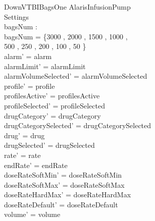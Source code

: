 \begin{schema}{DownVTBIBagsOne}
	\Delta AlarisInfusionPump\\
	 Settings\\
	 \pagebreak 
	bagsNum : \nat \rel \nat\\
	\where
	bagsNum = \{3000 , 2000 , 1500 , 1000 , \\
	500 , 250 , 200 , 100 , 50 \}\\
	alarm' = alarm\\
	alarmLimit' = alarmLimit\\
	alarmVolumeSelected' = alarmVolumeSelected\\
	profile' = profile\\
	profilesActive' = profilesActive\\  
	  profileSelected' = profileSelected\\
	drugCategory' = drugCategory\\ drugCategorySelected' = drugCategorySelected\\
	drug' = drug\\ drugSelected' = drugSelected\\
	rate' = rate\\
	endRate' = endRate\\
	doseRateSoftMin' = doseRateSoftMin\\
	doseRateSoftMax' = doseRateSoftMax\\
	doseRateHardMax' = doseRateHardMax\\
	doseRateDefault' = doseRateDefault\\
	volume' = volume\\

\end{schema}
